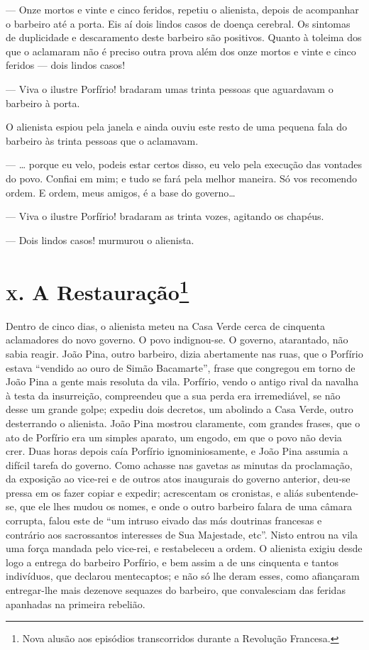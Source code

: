 --- Onze mortos e vinte e cinco feridos, repetiu o alienista, depois de
acompanhar o barbeiro até a porta. Eis aí dois lindos casos de doença
cerebral. Os sintomas de duplicidade e descaramento deste barbeiro são
positivos. Quanto à toleima dos que o aclamaram não é preciso outra
prova além dos onze mortos e vinte e cinco feridos --- dois lindos
casos!

--- Viva o ilustre Porfírio! bradaram umas trinta pessoas que aguardavam
o barbeiro à porta.

O alienista espiou pela janela e ainda ouviu este resto de uma pequena
fala do barbeiro às trinta pessoas que o aclamavam.

--- \ldots{} porque eu velo, podeis estar certos disso, eu velo pela
execução das vontades do povo. Confiai em mim; e tudo se fará pela
melhor maneira. Só vos recomendo ordem. E ordem, meus amigos, é a base
do governo\ldots{}

--- Viva o ilustre Porfírio! bradaram as trinta vozes, agitando os
chapéus.

--- Dois lindos casos! murmurou o alienista.

\section*{\textsc{x.} A Restauração\protect\footnote[*]{\MakeUppercase{N}ova alusão aos episódios transcorridos durante a \MakeUppercase{R}evolução \MakeUppercase{F}rancesa.}}

Dentro de cinco dias, o alienista meteu na Casa Verde cerca de cinquenta
aclamadores do novo governo. O povo indignou-se. O governo, atarantado,
não sabia reagir. João Pina, outro barbeiro, dizia abertamente nas ruas,
que o Porfírio estava ``vendido ao ouro de Simão Bacamarte'', frase que
congregou em torno de João Pina a gente mais resoluta da vila. Porfírio,
vendo o antigo rival da navalha à testa da insurreição, compreendeu que
a sua perda era irremediável, se não desse um grande golpe; expediu dois
decretos, um abolindo a Casa Verde, outro desterrando o alienista. João
Pina mostrou claramente, com grandes frases, que o ato de Porfírio era
um simples aparato, um engodo, em que o povo não devia crer. Duas horas
depois caía Porfírio ignominiosamente, e João Pina assumia a difícil
tarefa do governo. Como achasse nas gavetas as minutas da proclamação,
da exposição ao vice-rei e de outros atos inaugurais do governo
anterior, deu-se pressa em os fazer copiar e expedir; acrescentam os
cronistas, e aliás subentende-se, que ele lhes mudou os nomes, e onde o
outro barbeiro falara de uma câmara corrupta, falou este de ``um intruso
eivado das más doutrinas francesas e contrário aos sacrossantos
interesses de Sua Majestade, etc''. Nisto entrou na vila uma força
mandada pelo vice-rei, e restabeleceu a ordem. O alienista exigiu desde
logo a entrega do barbeiro Porfírio, e bem assim a de uns cinquenta e
tantos indivíduos, que declarou mentecaptos; e não só lhe deram esses,
como afiançaram entregar-lhe mais dezenove sequazes do barbeiro, que
convalesciam das feridas apanhadas na primeira rebelião.

